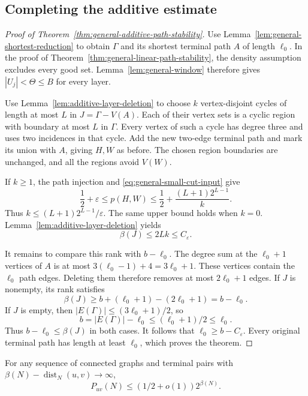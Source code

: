 \subsection{Completing the additive estimate}

\begin{proof}[Proof of Theorem~\ref{thm:general-additive-path-stability}]
Use Lemma~\ref{lem:general-shortest-reduction} to obtain $\Gamma$ and its shortest terminal path $A$ of length $\ell_0$.
In the proof of Theorem~\ref{thm:general-linear-path-stability}, the density assumption excludes every good set.
Lemma~\ref{lem:general-window} therefore gives $|U_j|<\Theta\le B$ for every layer.

Use Lemma~\ref{lem:additive-layer-deletion} to choose $k$ vertex-disjoint cycles of length at most $L$ in $J=\Gamma-V(A)$.
Each of their vertex sets is a cyclic region with boundary at most $L$ in $\Gamma$.
Every vertex of such a cycle has degree three and uses two incidences in that cycle.
Add the new two-edge terminal path and mark its union with $A$, giving $H,W$ as before.
The chosen region boundaries are unchanged, and all the regions avoid $V(W)$.

If $k\ge1$, the path injection and \eqref{eq:general-small-cut-input} give
\[
 \frac12+\varepsilon\le p(H,W)
 \le\frac12+\frac{(L+1)2^{L-1}}{k}.
\]
Thus $k\le(L+1)2^{L-1}/\varepsilon$.
The same upper bound holds when $k=0$.
Lemma~\ref{lem:additive-layer-deletion} yields
\[
 \beta(J)\le2Lk\le C_\varepsilon.
\]

It remains to compare this rank with $b-\ell_0$.
The degree sum at the $\ell_0+1$ vertices of $A$ is at most $3(\ell_0-1)+4=3\ell_0+1$.
These vertices contain the $\ell_0$ path edges.
Deleting them therefore removes at most $2\ell_0+1$ edges.
If $J$ is nonempty, its rank satisfies
\[
 \beta(J)\ge b+(\ell_0+1)-(2\ell_0+1)=b-\ell_0.
\]
If $J$ is empty, then $|E(\Gamma)|\le(3\ell_0+1)/2$, so
\[
 b=|E(\Gamma)|-\ell_0\le(\ell_0+1)/2\le\ell_0.
\]
Thus $b-\ell_0\le\beta(J)$ in both cases.
It follows that $\ell_0\ge b-C_\varepsilon$.
Every original terminal path has length at least $\ell_0$, which proves the theorem.
\end{proof}

\begin{corollary}\label{cor:general-rank-deficit}
For any sequence of connected graphs and terminal pairs with
$\beta(N)-\operatorname{dist}_N(u,v)\to\infty$,
\[
 P_{uv}(N)\le(1/2+o(1))2^{\beta(N)}.
\]
\end{corollary}

